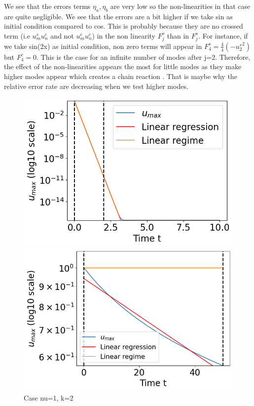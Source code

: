 \documentclass[12pt]{article}
\begin{document}
We see that the errors terms $\eta_a, \eta_b$ are very low so the non-linearities in that case are quite negligible. We see that the errors are a bit higher if we take sin 
as initial condition compared to cos. This is probably because they are no crossed term (i.e $u_m^s u_n^c$ and not $u_m^c u_n^c$) in  the non linearity 
$F_j^s$ than in $F_j^s$. For instance, if we take sin(2x) as initial condition, non zero terms will appear in $F_4^s=\frac{4}{4}(-{u_2^s}^2)$ but $F_4^c=0$. 
This is the case for an infinite number of modes after j=2. Therefore, the effect of the non-linearities appears the most for little modes as they make higher 
modes appear which creates a chain reaction . That is maybe why the relative error rate are decreasing when we test higher modes. 



\begin{figure}[htbp]
    \centering
    \begin{minipage}[b]{0.45\textwidth}
        \centering
        \includegraphics[width=\textwidth]{KS_eq/plot_exp_decay.png}
        \caption{Case nu=1, k=2}
        \label{fig:image1}
    \end{minipage}
    \hfill
    \begin{minipage}[b]{0.45\textwidth}
        \centering
        \includegraphics[width=\textwidth]{KS_eq/plot_decay_nu_1_k_1png.png}

\end{minipage}
\end{figure}
\end{document}
